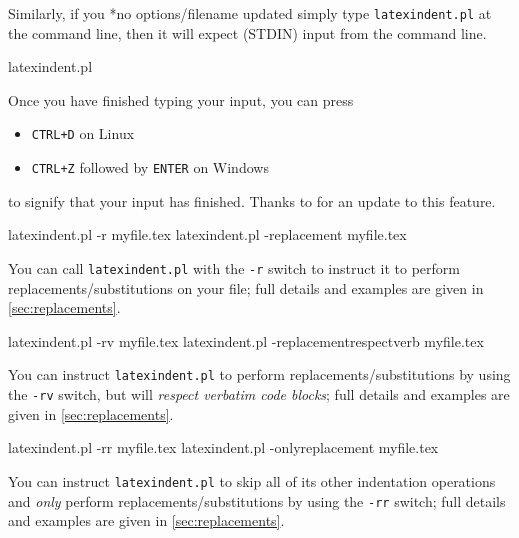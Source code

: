 	Similarly, if you%
	*{no options/filename updated} simply type \texttt{latexindent.pl} at the command line, then
	it will expect (STDIN) input from the command line.
	\begin{commandshell}
latexindent.pl
\end{commandshell}

	Once you have finished typing your input, you can press
	\begin{itemize}
		\item \texttt{CTRL+D} on Linux
		\item \texttt{CTRL+Z} followed by \texttt{ENTER} on Windows
	\end{itemize}
	to signify that your input has finished. Thanks to \cite{xu-cheng} for an update to this
	feature.
	\begin{commandshell}
latexindent.pl -r myfile.tex
latexindent.pl -replacement myfile.tex
\end{commandshell}
	You can%
	call \texttt{latexindent.pl} with the \texttt{-r} switch to instruct it to perform
	replacements/substitutions on your file; full details and examples are given in
	\vref{sec:replacements}.

	\begin{commandshell}
latexindent.pl -rv myfile.tex
latexindent.pl -replacementrespectverb myfile.tex
\end{commandshell}
	You can%
	 instruct \texttt{latexindent.pl} to perform
	replacements/substitutions by using the \texttt{-rv} switch, but will \emph{respect
		verbatim code blocks}; full details and examples are given in \vref{sec:replacements}.

	\begin{commandshell}
latexindent.pl -rr myfile.tex
latexindent.pl -onlyreplacement myfile.tex
\end{commandshell}
	You can%
	 instruct \texttt{latexindent.pl} to skip all of its other indentation operations
	and \emph{only} perform replacements/substitutions by using the \texttt{-rr} switch; full
	details and examples are given in \vref{sec:replacements}.

